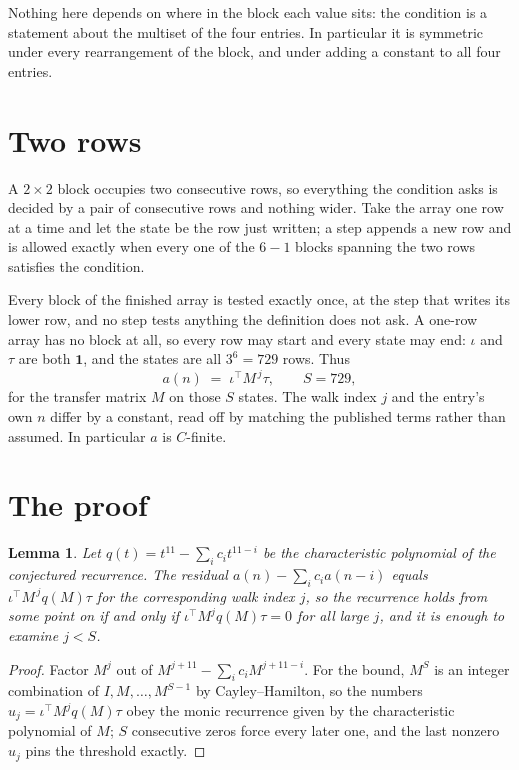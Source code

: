 \documentclass[11pt,a4paper]{article}
\theoremstyle{plain}
\newtheorem{lemma}[theorem]{Lemma}
\theoremstyle{definition}
\begin{document}
Nothing here depends on where in the block each value sits: the condition is a statement about
the multiset of the four entries. In particular it is symmetric under every rearrangement of
the block, and under adding a constant to all four entries.

\section{Two rows}

A $2\times2$ block occupies two consecutive rows, so everything the condition asks is decided
by a pair of consecutive rows and nothing wider. Take the array one row at a time and let the
state be the row just written; a step appends a new row and is allowed exactly when every one
of the $6-1$ blocks spanning the two rows satisfies the condition.

Every block of the finished array is tested exactly once, at the step that writes its lower
row, and no step tests anything the definition does not ask. A one-row array has no block at
all, so every row may start and every state may end: $\iota$ and $\tau$ are both
$\mathbf{1}$, and the states are all $3^{6}=729$ rows. Thus
\[
a(n)\;=\;\iota^{\!\top}M^{\,j}\tau ,\qquad S=729,
\]
for the transfer matrix $M$ on those $S$ states. The walk index $j$ and the entry's own $n$
differ by a constant, read off by matching the published terms rather than assumed. In
particular $a$ is $C$-finite.

\section{The proof}

\begin{lemma}\label{lem:crit}
Let $q(t)=t^{11}-\sum_i c_it^{11-i}$ be the characteristic polynomial of the
conjectured recurrence. The residual $a(n)-\sum_ic_ia(n-i)$ equals
$\iota^{\!\top}M^{\,j}q(M)\tau$ for the corresponding walk index $j$, so the recurrence
holds from some point on if and only if $\iota^{\!\top}M^{j}q(M)\tau=0$ for all large $j$,
and it is enough to examine $j<S$.
\end{lemma}

\begin{proof}
Factor $M^{j}$ out of $M^{j+11}-\sum_ic_iM^{j+11-i}$. For the bound, $M^{S}$
is an integer combination of $I,M,\dots,M^{S-1}$ by Cayley--Hamilton, so the numbers
$u_j=\iota^{\!\top}M^{j}q(M)\tau$ obey the monic recurrence given by the characteristic
polynomial of $M$; $S$ consecutive zeros force every later one, and the last nonzero $u_j$
pins the threshold exactly.
\end{proof}
\end{document}
